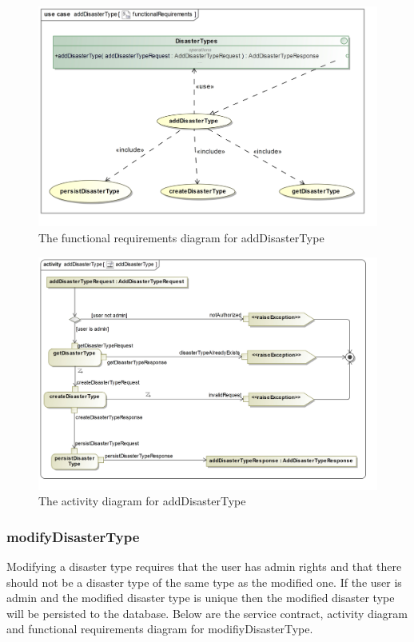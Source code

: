 \begin{figure}[H]
	\centering
	\includegraphics[width=1.2\textwidth]{../images/funcReq/AddDisasterTypeFunctionalRequirements.jpg}
	\caption{The functional requirements diagram for addDisasterType \label{overflow}}
\end{figure}

\begin{figure}[H]
	\centering
	\includegraphics[scale=0.22]{../images/funcReq/addDisasterTypeActivityDiagram.jpg}
	\caption{The activity diagram for addDisasterType \label{overflow}}
\end{figure}

\subsubsection{modifyDisasterType}

Modifying a disaster type requires that the user has admin rights and that there should not be a disaster type of the same type as the modified one. If the user is admin and the modified disaster type is unique then the modified disaster type will be persisted to the database. Below are the service contract, activity diagram and functional requirements diagram for modifiyDisasterType.

